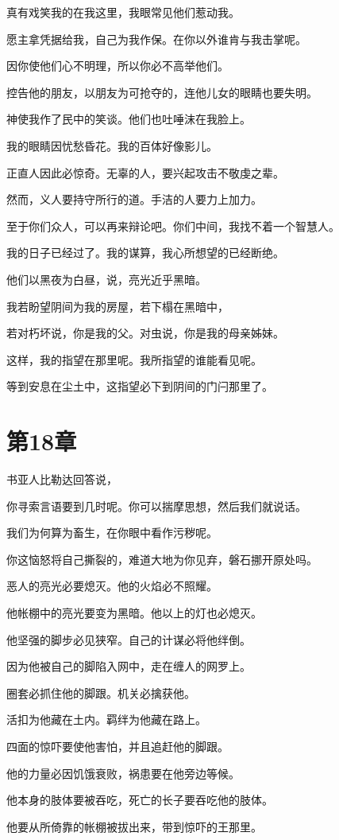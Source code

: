 \documentclass[12pt,oneside]{book}
\begin{document}
真有戏笑我的在我这里，我眼常见他们惹动我。

愿主拿凭据给我，自己为我作保。在你以外谁肯与我击掌呢。

因你使他们心不明理，所以你必不高举他们。

控告他的朋友，以朋友为可抢夺的，连他儿女的眼睛也要失明。

神使我作了民中的笑谈。他们也吐唾沫在我脸上。

我的眼睛因忧愁昏花。我的百体好像影儿。

正直人因此必惊奇。无辜的人，要兴起攻击不敬虔之辈。

然而，义人要持守所行的道。手洁的人要力上加力。

至于你们众人，可以再来辩论吧。你们中间，我找不着一个智慧人。

我的日子已经过了。我的谋算，我心所想望的已经断绝。

他们以黑夜为白昼，说，亮光近乎黑暗。

我若盼望阴间为我的房屋，若下榻在黑暗中，

若对朽坏说，你是我的父。对虫说，你是我的母亲姊妹。

这样，我的指望在那里呢。我所指望的谁能看见呢。

等到安息在尘土中，这指望必下到阴间的门闩那里了。


\chapter{第18章}
书亚人比勒达回答说，

你寻索言语要到几时呢。你可以揣摩思想，然后我们就说话。

我们为何算为畜生，在你眼中看作污秽呢。

你这恼怒将自己撕裂的，难道大地为你见弃，磐石挪开原处吗。

恶人的亮光必要熄灭。他的火焰必不照耀。

他帐棚中的亮光要变为黑暗。他以上的灯也必熄灭。

他坚强的脚步必见狭窄。自己的计谋必将他绊倒。

因为他被自己的脚陷入网中，走在缠人的网罗上。

圈套必抓住他的脚跟。机关必擒获他。

活扣为他藏在土内。羁绊为他藏在路上。

四面的惊吓要使他害怕，并且追赶他的脚跟。

他的力量必因饥饿衰败，祸患要在他旁边等候。

他本身的肢体要被吞吃，死亡的长子要吞吃他的肢体。

他要从所倚靠的帐棚被拔出来，带到惊吓的王那里。
\end{document}

